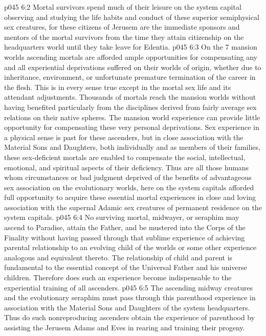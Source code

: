\vs p045 6:2 Mortal survivors spend much of their leisure on the system capital observing and studying the life habits and conduct of these superior semiphysical sex creatures, for these citizens of Jerusem are the immediate sponsors and mentors of the mortal survivors from the time they attain citizenship on the headquarters world until they take leave for Edentia.
\vs p045 6:3 On the 7 mansion worlds ascending mortals are afforded ample opportunities for compensating any and all experiential deprivations suffered on their worlds of origin, whether due to inheritance, environment, or unfortunate premature termination of the career in the flesh. This is in every sense true except in the mortal sex life and its attendant adjustments. Thousands of mortals reach the mansion worlds without having benefited particularly from the disciplines derived from fairly average sex relations on their native spheres. The mansion world experience can provide little opportunity for compensating these very personal deprivations. Sex experience in a physical sense is past for these ascenders, but in close association with the Material Sons and Daughters, both individually and as members of their families, these sex\hyp{}deficient mortals are enabled to compensate the social, intellectual, emotional, and spiritual aspects of their deficiency. Thus are all those humans whom circumstances or bad judgment deprived of the benefits of advantageous sex association on the evolutionary worlds, here on the system capitals afforded full opportunity to acquire these essential mortal experiences in close and loving association with the supernal Adamic sex creatures of permanent residence on the system capitals.
\vs p045 6:4 \pc No surviving mortal, midwayer, or seraphim may ascend to Paradise, attain the Father, and be mustered into the Corps of the Finality without having passed through that sublime experience of achieving parental relationship to an evolving child of the worlds or some other experience analogous and equivalent thereto. The relationship of child and parent is fundamental to the essential concept of the Universal Father and his universe children. Therefore does such an experience become indispensable to the experiential training of all ascenders.
\vs p045 6:5 The ascending midway creatures and the evolutionary seraphim must pass through this parenthood experience in association with the Material Sons and Daughters of the system headquarters. Thus do such nonreproducing ascenders obtain the experience of parenthood by assisting the Jerusem Adams and Eves in rearing and training their progeny.
